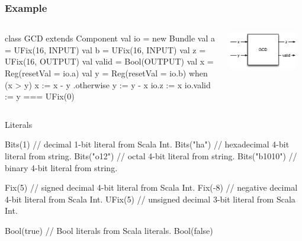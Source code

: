 \documentclass[xcolor=pdflatex,dvipsnames,table]{beamer}
\newenvironment{FramedVerb}%
{\VerbatimEnvironment
\begin{Sbox}\begin{minipage}{.94\textwidth}\begin{Verbatim}}%
{\end{Verbatim}\end{minipage}\end{Sbox}
\setlength{\fboxsep}{8pt}\fbox{\TheSbox}}
\begin{document}
\begin{frame}[fragile]
\frametitle{Example}
\begin{columns}


\begin{footnotesize}
\begin{scala}
class GCD extends Component {
  val io = new Bundle {
    val a     = UFix(16, INPUT)
    val b     = UFix(16, INPUT)
    val z     = UFix(16, OUTPUT)
    val valid = Bool(OUTPUT) }
  val x = Reg(resetVal = io.a)
  val y = Reg(resetVal = io.b)
  when (x > y) {
    x := x - y
  } .otherwise {
    y := y - x
  }
  io.z     := x
  io.valid := y === UFix(0)
}
\end{scala}
\end{footnotesize}


\begin{center}
\includegraphics[width=0.9\textwidth]{figs/gcd.pdf} 
\end{center}

\end{columns}
\end{frame}


\begin{frame}[fragile]{Literals}
\begin{scala}
Bits(1)       // decimal 1-bit literal from Scala Int. 
Bits("ha")    // hexadecimal 4-bit literal from string.
Bits("o12")   // octal 4-bit literal from string. 
Bits("b1010") // binary 4-bit literal from string.

Fix(5)        // signed decimal 4-bit literal from Scala Int.
Fix(-8)       // negative decimal 4-bit literal from Scala Int.
UFix(5)       // unsigned decimal 3-bit literal from Scala Int.

Bool(true)    // Bool literals from Scala literals.
Bool(false)
\end{scala}
\end{frame}
 
\end{document}
